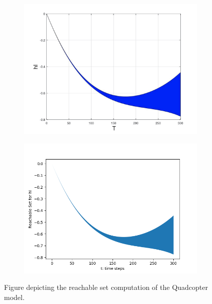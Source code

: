 \documentclass[EPiC]{easychair}
\begin{document}
\begin{figure}[h]
    \hspace{-12ex}
    \begin{subfigure}{0.6\textwidth}
    \centering
    \includegraphics[width=1.15\textwidth]{SapoFigures/Quad/SapoQuad_HI.jpg}
    \end{subfigure}
    \hspace{5ex}
    \begin{subfigure}{0.6\textwidth}
    \centering
    \includegraphics[width=1.13\textwidth]{SapoFigures/Quad/KaaQuad_HI.png}
    \end{subfigure}
    
    \caption{Figure depicting the reachable set computation of the Quadcopter model.} 
    \label{fig3}
\end{figure}
\end{document}
